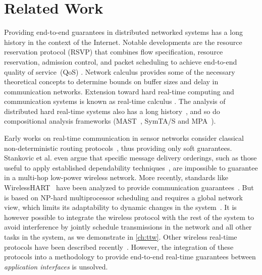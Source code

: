 
\pagebreak

\section{Related Work}
\label{sec:relWork}

Providing end-to-end guarantees in distributed networked systems has a long history in the context of the Internet. Notable developments are the resource reservation protocol (RSVP) that combines flow specification, resource reservation, admission control, and packet scheduling to achieve end-to-end quality of service~(QoS) \cite{zhang1993rsvp}. Network calculus \cite{cruz1991calculus} provides some of the necessary theoretical concepts to determine bounds on buffer sizes and delay in communication networks.
Extension toward hard real-time computing and communication systems is known as real-time calculus \cite{thiele2000Realtime}.
The analysis of distributed hard real-time systems also has a long history~\cite{tindell1994Holistic}, and so do compositional analysis frameworks (MAST~\cite{gonzalezharbour2001MAST}, SymTA/S \cite{henia2005System} and MPA~\cite{wandeler2006System}).

Early works on real-time communication in sensor networks consider classical non-deterministic routing protocols~\cite{lu2002RAP,stankovic2003Realtime,he2003SPEED}, thus providing only soft guarantees.
Stankovic et al. \cite{stankovic2003Realtime} even argue that specific message delivery orderings, such as those useful to apply established dependability techniques~\cite{ferrari2013Virtus}, are impossible to guarantee in a multi-hop low-power wireless network.
More recently, standards like WirelessHART~\cite{wirelessHART} have been analyzed to provide communication guarantees~\cite{saifullah2015EndtoEnd,saifullah2010RealTime}.
But~\cite{saifullah2010RealTime} is based on NP-hard multiprocessor scheduling and requires a global network view, which limits its adaptability to dynamic changes in the system~\cite{akerberg2011Measurements}.
It is however possible to integrate the wireless protocol with the rest of the system to avoid interference by jointly schedule transmissions in the network and all other tasks in the system, as we demonstrate in \cref{ch:ttw}.
Other wireless real-time protocols have been described recently~\cite{odonovan2013GINSENG,watteyne2017Teaching}. However, the integration of these protocols into a methodology to provide end-to-end real-time guarantees between \emph{application interfaces} is unsolved.

